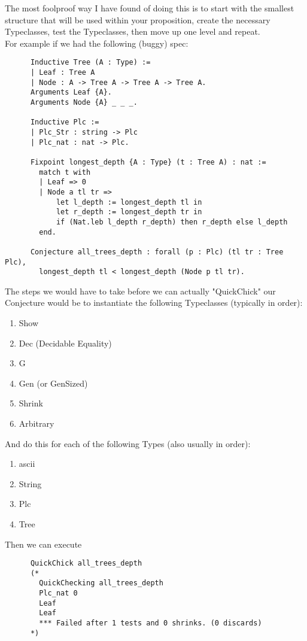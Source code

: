 \documentclass{article}
\begin{document}
    The most foolproof way I have found of doing this is to start with the smallest structure that will be used within your proposition, create the necessary Typeclasses, test the Typeclasses, then move up one level and repeat. \\
    For example if we had the following (buggy) spec:
    \begin{verbatim}     
      Inductive Tree (A : Type) :=
      | Leaf : Tree A 
      | Node : A -> Tree A -> Tree A -> Tree A.
      Arguments Leaf {A}.
      Arguments Node {A} _ _ _.

      Inductive Plc :=
      | Plc_Str : string -> Plc
      | Plc_nat : nat -> Plc.

      Fixpoint longest_depth {A : Type} (t : Tree A) : nat :=
        match t with
        | Leaf => 0
        | Node a tl tr => 
            let l_depth := longest_depth tl in
            let r_depth := longest_depth tr in
            if (Nat.leb l_depth r_depth) then r_depth else l_depth
        end.
      
      Conjecture all_trees_depth : forall (p : Plc) (tl tr : Tree Plc),
        longest_depth tl < longest_depth (Node p tl tr).
    \end{verbatim}
    The steps we would have to take before we can actually "QuickChick" our Conjecture would be to instantiate the following Typeclasses (typically in order): 
    \begin{enumerate}
      \item Show
      \item Dec (Decidable Equality)
      \item G
      \item Gen (or GenSized)
      \item Shrink
      \item Arbitrary
    \end{enumerate}
    And do this for each of the following Types (also usually in order):
    \begin{enumerate}
      \item ascii
      \item String
      \item Plc
      \item Tree
    \end{enumerate}
    Then we can execute 
    \begin{verbatim}
      QuickChick all_trees_depth
      (*
        QuickChecking all_trees_depth
        Plc_nat 0
        Leaf
        Leaf
        *** Failed after 1 tests and 0 shrinks. (0 discards)
      *)
    \end{verbatim}
\end{document}
